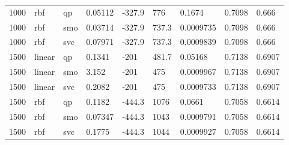\begin{tabular}{lllllllll}
1000 & rbf & qp & 0.05112 & -327.9 & 776 & 0.1674 & 0.7098 & 0.666 \\
1000 & rbf & smo & 0.03714 & -327.9 & 737.3 & 0.0009735 & 0.7098 & 0.666 \\
1000 & rbf & svc & 0.07971 & -327.9 & 737.3 & 0.0009839 & 0.7098 & 0.666 \\
1500 & linear & qp & 0.1341 & -201 & 481.7 & 0.05168 & 0.7138 & 0.6907 \\
1500 & linear & smo & 3.152 & -201 & 475 & 0.0009967 & 0.7138 & 0.6907 \\
1500 & linear & svc & 0.2082 & -201 & 475 & 0.0009733 & 0.7138 & 0.6907 \\
1500 & rbf & qp & 0.1182 & -444.3 & 1076 & 0.0661 & 0.7058 & 0.6614 \\
1500 & rbf & smo & 0.07347 & -444.3 & 1043 & 0.0009791 & 0.7058 & 0.6614 \\
1500 & rbf & svc & 0.1775 & -444.3 & 1044 & 0.0009927 & 0.7058 & 0.6614 \\
\hline
\end{tabular}

